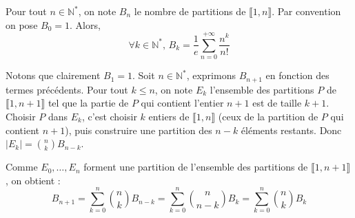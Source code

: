 




	
	\begin{theorem}
		Pour tout $n \in \mathbb{N}^*$, on note $B_n$ le nombre de partitions de $\llbracket 1, n \rrbracket$. Par convention on pose $B_0 = 1$. Alors,
		\[ \forall k \in \mathbb{N}^*, \, B_k = \frac{1}{e} \sum_{n=0}^{+\infty} \frac{n^k}{n!} \]
	\end{theorem}

	\begin{demonstration}
		Notons que clairement $B_1 = 1$. Soit $n \in \mathbb{N}^*$, exprimons $B_{n+1}$ en fonction des termes précédents. Pour tout $k \leq n$, on note $E_k$ l'ensemble des partitions $P$ de $\llbracket 1, n+1 \rrbracket$ tel que la partie de $P$ qui contient l'entier $n+1$ est de taille $k+1$. Choisir $P$ dans $E_k$, c'est choisir $k$ entiers de $\llbracket 1, n \rrbracket$ (ceux de la partition de $P$ qui contient $n+1$), puis construire une partition des $n-k$ éléments restants. Donc $|E_k| = \binom{n}{k} B_{n-k}$.
		
		\medskip
		Comme $E_0, \dots, E_n$ forment une partition de l'ensemble des partitions de $\llbracket 1, n+1 \rrbracket$, on obtient :
		\[ B_{n+1} = \sum_{k=0}^n \binom{n}{k} B_{n-k} = \sum_{k=0}^n \binom{n}{n-k} B_k = \sum_{k=0}^n \binom{n}{k} B_k \tag{$*$} \]
		

\end{demonstration}
